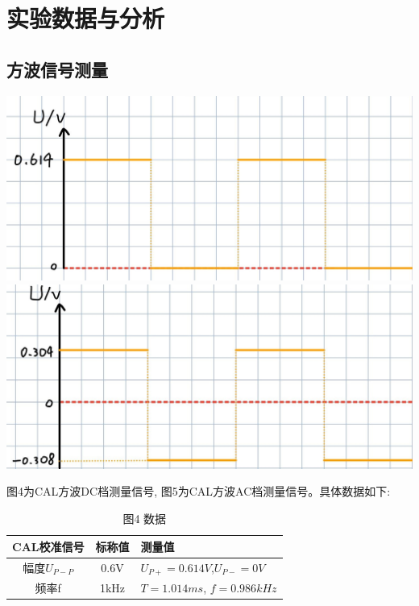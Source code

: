 \documentclass[a4paper]{article}
\begin{document}
    \hspace{2.8cm}{\small 图三 (a)}\hspace{4.8cm}{\small 图三 (b)}


    \section{实验数据与分析}\label{sec:4}

    \subsection{方波信号测量}\label{subsec:3}
    \includegraphics[height=0.13\textheight]{5}
    \includegraphics[height=0.13\textheight]{6}

    \hspace{2.7cm}{\small 图4}\hspace{4.9cm}{\small 图5}

    {图4为CAL方波DC档测量信号, 图5为CAL方波AC档测量信号。具体数据如下: }

    \begin{table}[htbp]
        \centering
        \caption{图4 数据}
        \begin{tabular}{|c|c|p{5cm}|}
            \hline
            CAL校准信号  & 标称值  & 测量值                         \\
            \hline
            幅度$U_{P-P}$ & 0.6V & $U_{P+}=0.614V$,$U_{P-}=0V$ \\
            \hline
            频率f         & 1kHz & $T=1.014ms$, $f=0.986kHz$   \\
            \hline
        \end{tabular}\label{tab:table}
    \end{table}
\end{document}
